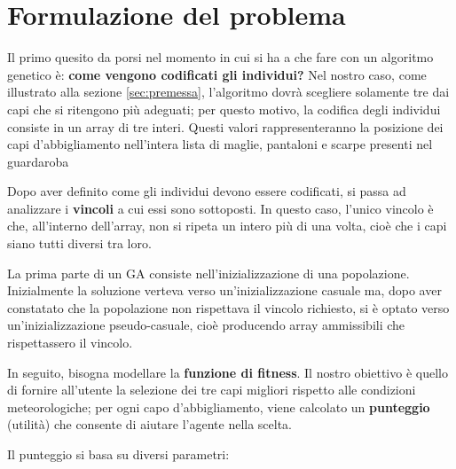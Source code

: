 \documentclass[a4paper, 11pt, oneside]{report}
\begin{document}
            \newpage
            \section{Formulazione del problema}
            Il primo quesito da porsi nel momento in cui si ha a che fare con un algoritmo genetico è: \textbf{come vengono
            codificati gli individui?} Nel nostro caso, come illustrato alla sezione \ref{sec:premessa}, l'algoritmo dovrà
            scegliere solamente tre dai capi che si ritengono più adeguati;
            per questo motivo, la codifica degli individui consiste in un array di tre interi.
            Questi valori rappresenteranno la posizione dei capi d'abbigliamento nell'intera lista di maglie, pantaloni
            e scarpe presenti nel guardaroba
            \\
            \par \noindent Dopo aver definito come gli individui devono essere codificati, si passa ad analizzare i \textbf{vincoli} a
            cui essi sono sottoposti.
            In questo caso, l'unico vincolo è che, all'interno dell'array, non si ripeta un intero più di una volta,
            cioè che i capi siano tutti diversi tra loro.
            \\
            \par \noindent La prima parte di un GA consiste nell'inizializzazione di una popolazione. Inizialmente la soluzione
            verteva verso un'inizializzazione casuale ma, dopo aver constatato che la popolazione non rispettava il vincolo richiesto,
            si è optato verso un'inizializzazione pseudo-casuale, cioè producendo array ammissibili che rispettassero il vincolo.
            \\
            \par \noindent In seguito, bisogna modellare la \textbf{funzione di fitness}.
            Il nostro obiettivo è quello di fornire all'utente la selezione dei tre capi migliori rispetto alle condizioni
            meteorologiche; per ogni capo d'abbigliamento, viene calcolato un \textbf{punteggio} (utilità) che consente di aiutare
            l'agente nella scelta.
            \\
            \par \noindent Il punteggio si basa su diversi parametri:
\end{document}

